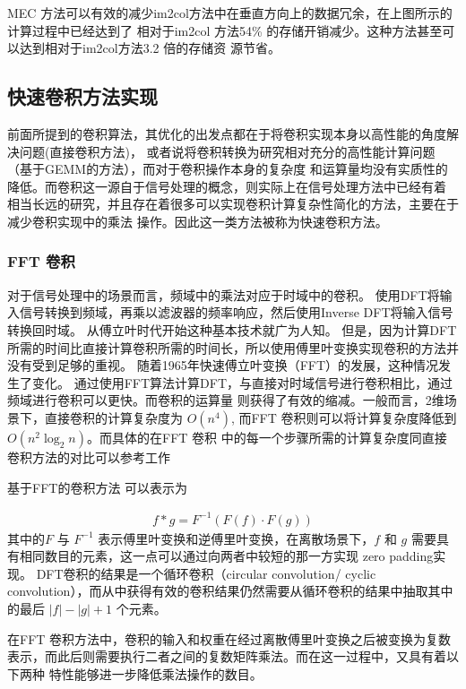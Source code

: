MEC 方法可以有效的减少im2col方法中在垂直方向上的数据冗余，在上图所示的计算过程中已经达到了
相对于im2col 方法54\% 的存储开销减少。这种方法甚至可以达到相对于im2col方法3.2 倍的存储资
源节省。

\subsection{快速卷积方法实现}

前面所提到的卷积算法，其优化的出发点都在于将卷积实现本身以高性能的角度解决问题(直接卷积方法)，
或者说将卷积转换为研究相对充分的高性能计算问题（基于GEMM的方法），而对于卷积操作本身的复杂度
和运算量均没有实质性的降低。而卷积这一源自于信号处理的概念，则实际上在信号处理方法中已经有着
相当长远的研究，并且存在着很多可以实现卷积计算复杂性简化的方法，主要在于减少卷积实现中的乘法
操作。因此这一类方法被称为快速卷积方法。

\subsubsection{FFT 卷积}
对于信号处理中的场景而言，频域中的乘法对应于时域中的卷积。 使用DFT将输入信号转换到频域，再乘以滤波器的频率响应，然后使用Inverse DFT将输入信号转换回时域。
从傅立叶时代开始这种基本技术就广为人知。 但是，因为计算DFT所需的时间比直接计算卷积所需的时间长，所以使用傅里叶变换实现卷积的方法并没有受到足够的重视。
随着1965年快速傅立叶变换（FFT）的发展，这种情况发生了变化。 通过使用FFT算法计算DFT，与直接对时域信号进行卷积相比，通过频域进行卷积可以更快。而卷积的运算量
则获得了有效的缩减。一般而言，2维场景下，直接卷积的计算复杂度为 $O(n^4)$, 而FFT 卷积则可以将计算复杂度降低到 $O(n^2 \log_{2}n)$。而具体的在FFT 卷积
中的每一个步骤所需的计算复杂度同直接卷积方法的对比可以参考工作\cite{Mathieu2013FastTO}

基于FFT的卷积方法\cite{Zlateski2018FFTCA} \cite{Mathieu2013FastTO}可以表示为

\begin{align}
  f * g = F^{-1}(F(f)  \cdot F(g))
\end{align}
其中的$F$ 与 $F^{-1}$ 表示傅里叶变换和逆傅里叶变换，在离散场景下，$f$ 和 $g$ 需要具有相同数目的元素，这一点可以通过向两者中较短的那一方实现 zero padding实现。
DFT卷积的结果是一个循环卷积（circular convolution/ cyclic convolution），而从中获得有效的卷积结果仍然需要从循环卷积的结果中抽取其中的最后 $|f| - |g| + 1 $
个元素。

在FFT 卷积方法中，卷积的输入和权重在经过离散傅里叶变换之后被变换为复数表示，而此后则需要执行二者之间的复数矩阵乘法。而在这一过程中，又具有着以下两种
特性能够进一步降低乘法操作的数目。

